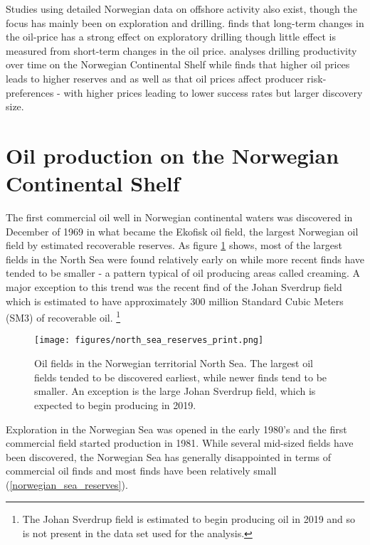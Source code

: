 \documentclass[12pt]{article}
\begin{document}
Studies using detailed Norwegian data on offshore activity also exist, though the focus has mainly been on exploration and drilling.  \citet{mohn_exploration_2008} finds that long-term changes in the oil-price has a strong effect on exploratory drilling though little effect is measured from short-term changes in the oil price.  \citet{osmundsen_exploration_2010} analyses drilling productivity over time on the Norwegian Continental Shelf while \citet{mohn_efforts_2008} finds that higher oil prices leads to higher reserves and as well as that oil prices affect producer risk-preferences - with higher prices leading to lower success rates but larger discovery size.  


\section{Oil production on the Norwegian Continental Shelf}


The first commercial oil well in Norwegian continental waters was discovered in December of 1969 in what became the Ekofisk oil field, the largest Norwegian oil field by estimated recoverable reserves.  As figure \ref{north_sea_reserves} shows, most of the largest fields in the North Sea were found relatively early on while more recent finds have tended to be smaller - a pattern typical of oil producing areas called creaming.  A major exception to this trend was the recent find of the Johan Sverdrup field which is estimated to have approximately 300 million Standard Cubic Meters (SM3) of recoverable oil. \footnote{The Johan Sverdrup field is estimated to begin producing oil in 2019 and so is not present in the data set used for the analysis.}  

\begin{figure}
\texttt{[image: figures/north\_sea\_reserves\_print.png]}
\caption{Oil fields in the Norwegian territorial North Sea.  The largest oil fields tended to be discovered earliest, while newer finds tend to be smaller.  An exception is the large Johan Sverdrup field, which is expected to begin producing in 2019.}
\label{north_sea_reserves}
\end{figure}

Exploration in the Norwegian Sea was opened in the early 1980’s and the first commercial field started production in 1981.  While several mid-sized fields have been discovered, the Norwegian Sea has generally disappointed in terms of commercial oil finds and most finds have been relatively small (\ref{norwegian_sea_reserves}).  
\end{document}
